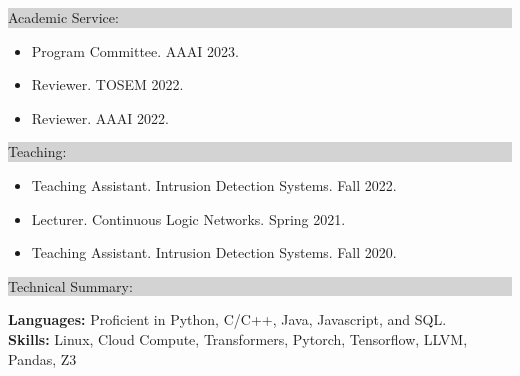 \documentclass{article} %
\newcommand{\rsection}[1]{
  \hspace{-0.4cm}\vspace{0.1cm}
\colorbox{lightgrey}{
\begin{minipage}{1.07\linewidth}
\vspace{0.22cm}
\fontsize{14pt}{16pt}\selectfont #1
\vspace{0.12cm}
\end{minipage}
}
\vspace*{-0.1cm}
}
\begin{document}
\pagebreak{}

\rsection{Academic Service:}
\hspace*{-0.1cm}
\begin{minipage}{1.01\linewidth}
\begin{itemize}[label={},itemindent=-2em,leftmargin=2em, parsep=4pt]
  \item Program Committee. AAAI 2023.
  \item Reviewer. TOSEM 2022.
  \item Reviewer. AAAI 2022.
  \end{itemize}
\end{minipage}

\vspace{0.2cm}
\rsection{Teaching:}
\hspace*{-0.1cm}
\begin{minipage}{1.01\linewidth}
\begin{itemize}[label={},itemindent=-2em,leftmargin=2em, parsep=4pt]
  \item Teaching Assistant. Intrusion Detection Systems. Fall 2022.
  \item Lecturer. Continuous Logic Networks. Spring 2021.
  \item Teaching Assistant. Intrusion Detection Systems. Fall 2020.
  \end{itemize}
\end{minipage}

\vspace{0.2cm}
\rsection{Technical Summary:}

\hspace*{-0.3cm}
\textbf{Languages:} Proficient in Python, C/C++, Java, Javascript, and SQL. \\
\hspace*{-0.3cm}
\textbf{Skills:} Linux, Cloud Compute, Transformers, Pytorch, Tensorflow, LLVM, Pandas, Z3
\end{document}
